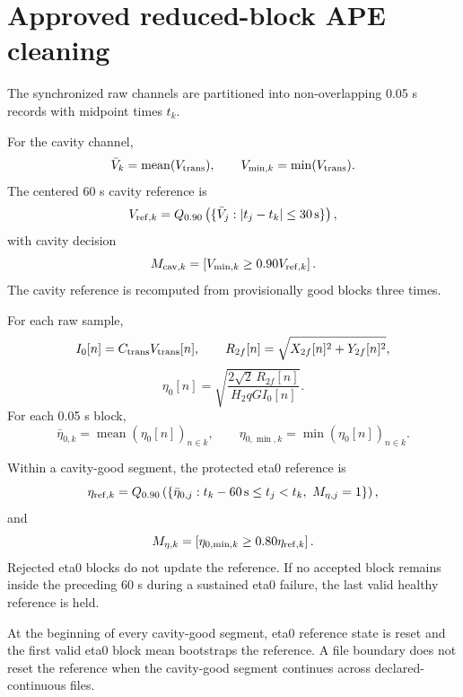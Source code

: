 \documentclass{article}
\begin{document}
\section*{Approved reduced-block APE cleaning}

The synchronized raw channels are partitioned into non-overlapping 0.05 s
records with midpoint times $t_k$.

For the cavity channel,
\begin{equation}
\bar V_k = \operatorname{mean}(V_{\rm trans}),
\qquad
V_{\min,k}=\min(V_{\rm trans}).
\end{equation}
The centered 60 s cavity reference is
\begin{equation}
V_{{\rm ref},k}
=
Q_{0.90}\left(
\{\bar V_j: |t_j-t_k|\le30\,{\rm s}\}
\right),
\end{equation}
with cavity decision
\begin{equation}
M_{{\rm cav},k}
=
\left[V_{\min,k}\ge0.90V_{{\rm ref},k}\right].
\end{equation}
The cavity reference is recomputed from provisionally good blocks three times.

For each raw sample,
\begin{equation}
I_0[n]=C_{\rm trans}V_{\rm trans}[n],
\qquad
R_{2f}[n]=\sqrt{X_{2f}[n]^2+Y_{2f}[n]^2},
\end{equation}
\begin{equation}
\eta_0[n]
=
\sqrt{
\frac{2\sqrt{2}\,R_{2f}[n]}
{H_2qGI_0[n]}
}.
\end{equation}
For each 0.05 s block,
\begin{equation}
\bar\eta_{0,k}
=
\operatorname{mean}(\eta_0[n])_{n\in k},
\qquad
\eta_{0,\min,k}
=
\min(\eta_0[n])_{n\in k}.
\end{equation}

Within a cavity-good segment, the protected eta0 reference is
\begin{equation}
\eta_{{\rm ref},k}
=
Q_{0.90}\left(
\left\{
\bar\eta_{0,j}:
t_k-60\,{\rm s}\le t_j<t_k,\
M_{\eta,j}=1
\right\}
\right),
\end{equation}
and
\begin{equation}
M_{\eta,k}
=
\left[
\eta_{0,\min,k}\ge0.80\eta_{{\rm ref},k}
\right].
\end{equation}
Rejected eta0 blocks do not update the reference. If no accepted block remains
inside the preceding 60 s during a sustained eta0 failure, the last valid
healthy reference is held.

At the beginning of every cavity-good segment, eta0 reference state is reset
and the first valid eta0 block mean bootstraps the reference. A file boundary
does not reset the reference when the cavity-good segment continues across
declared-continuous files.
\end{document}
